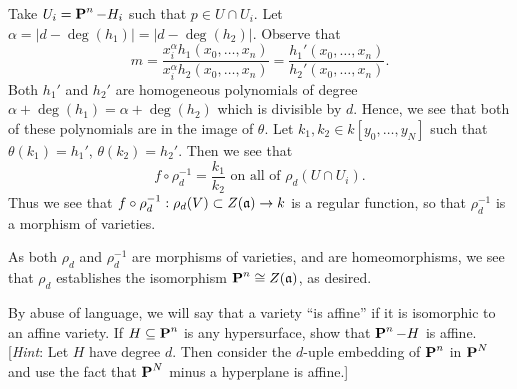 \documentclass[10pt]{amsart}
\begin{document}
\begin{solution}
\begin{luke}
\begin{itemize}[itemsep=2pt, label={\textbullet}]
            Take $U_i = \operatorname{\mathbf{P}}^n - H_i$ such that $p \in U \cap U_i$. Let 
            $\alpha = |d - \deg(h_1)| = |d - \deg(h_2)|$.  
            Observe that 
            \[
                m = \frac{x_i^{\alpha}h_1(x_0, \dots, x_n)}{x_i^{\alpha}h_2(x_0, \dots, x_n)} = \frac{h_1'(x_0, \dots, x_n)}{h_2'(x_0, \dots, x_n)}.
            \]
            Both $h_1'$ and $h_2'$ are homogeneous polynomials 
            of degree $\alpha + \deg(h_1) = \alpha + \deg(h_2)$ which is divisible by $d$.
            Hence, we see that both of these polynomials are in the image of $\theta$. 
            Let $k_1, k_2 \in k[y_0, \dots, y_N]$ such that $\theta(k_1) = h_1'$, $\theta(k_2) = h_2'$.
            Then we see that 
            \[
                f \circ \rho_d^{-1} = \frac{k_1}{k_2} \text{ on all of } \rho_d(U \cap U_i).
            \]
            Thus we see that $f \circ \rho_d^{-1}: \rho_d(V) \subset Z(\mathfrak{a}) \to k$ is a regular function, so that 
            $\rho_d^{-1}$ is a morphism of varieties. 
        \end{itemize}
        As both $\rho_d$ and $\rho_d^{-1}$ are morphisms 
        of varieties, and are homeomorphisms, we see that $\rho_d$ establishes the isomorphism 
        $\operatorname{\mathbf{P}}^n \cong Z(\mathfrak{a})$, as desired. 
    \end{luke}

\end{solution}

\begin{exercise}[3.5]
    By abuse of language, we will say that a variety ``is affine'' if it is 
    isomorphic to an affine variety. If $H \subseteq \operatorname{\mathbf{P}}^n$ is any hypersurface, 
    show that $\operatorname{\mathbf{P}}^n - H$ is affine. 
    [\emph{Hint}: Let $H$ have degree $d$. Then consider the $d$-uple 
    embedding of $\operatorname{\mathbf{P}}^n$ in $\operatorname{\mathbf{P}}^N$ and use the fact that $\operatorname{\mathbf{P}}^N$ minus 
    a hyperplane is affine.]
\end{exercise}
\end{document}
